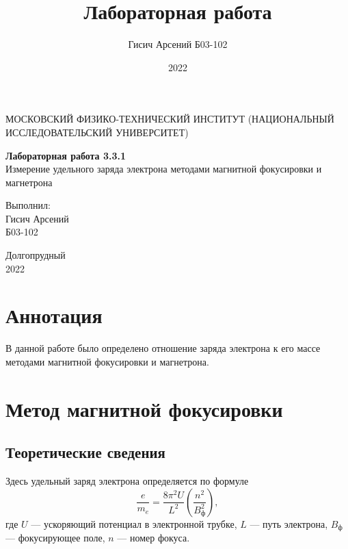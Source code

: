 \documentclass[a4paper, 12pt]{article}
\title{Лабораторная работа}
\author{Гисич Арсений Б03-102}
\date{2022}
\begin{document}
	\begin{center}
		{\large МОСКОВСКИЙ ФИЗИКО-ТЕХНИЧЕСКИЙ ИНСТИТУТ (НАЦИОНАЛЬНЫЙ ИССЛЕДОВАТЕЛЬСКИЙ УНИВЕРСИТЕТ)}
	\end{center}
	\vspace{5 cm}
	{\Large
		\begin{center}
			{\bf Лабораторная работа 3.3.1}\\[0.2 cm]
			Измерение удельного заряда электрона методами магнитной фокусировки и магнетрона
		\end{center}
	}
	\vspace{4 cm}
	\begin{flushright}
		{\Large Выполнил: \\
			\vspace{0.2 cm}
			Гисич Арсений \\
			\vspace{0.2 cm}
			Б03-102 \\}
	\end{flushright}
	\vspace{8 cm}
	\begin{center}
		Долгопрудный\\[0.1 cm]
		2022
	\end{center}
\thispagestyle{empty}

\section{Аннотация}

В данной работе было определено отношение заряда электрона к его массе методами магнитной фокусировки и магнетрона.

\section{Метод магнитной фокусировки}

\subsection{Теоретические сведения}

Здесь удельный заряд электрона определяется по формуле
\begin{equation}\label{eq1}
\dfrac{e}{m_e} = \dfrac{8\pi^2U}{L^2} \left(\dfrac{n^2}{B_{\text{ф}}^2} \right),
\end{equation}
где $U$ --- ускоряющий потенциал в электронной трубке, $L$ --- путь электрона, $B_{\text{ф}}$ --- фокусирующее поле, $n$ --- номер фокуса.
\end{document}
